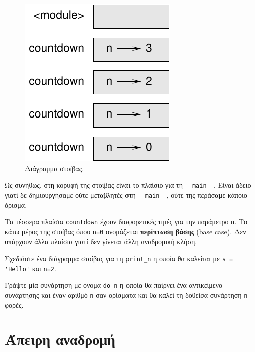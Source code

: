 \documentclass[10pt]{book}
\begin{document}
\begin{figure}
\centerline
{\includegraphics[scale=0.8]{figs/stack2.pdf}}
\caption{Διάγραμμα στοίβας.}
\label{fig.stack2}
\end{figure}


Ως συνήθως, στη κορυφή της στοίβας είναι το πλαίσιο για τη \verb"__main__". Είναι άδειο γιατί δε δημιουργήσαμε ούτε μεταβλητές στη \verb"__main__", ούτε της περάσαμε κάποιο όρισμα.

Τα τέσσερα πλαίσια {\tt countdown} έχουν διαφορετικές τιμές για την παράμετρο {\tt n}. Το κάτω μέρος της στοίβας όπου {\tt n=0} ονομάζεται {\bf περίπτωση βάσης} (base case). Δεν υπάρχουν άλλα πλαίσια γιατί δεν γίνεται άλλη αναδρομική κλήση.\\

\begin{exercise}

Σχεδιάστε ένα διάγραμμα στοίβας για τη \verb"print_n" η οποία θα καλείται με \verb"s = 'Hello'" και {\tt n=2}.\\

\end{exercise}

\begin{exercise}

Γράψτε μία συνάρτηση με όνομα \verb"do_n" η οποία θα παίρνει ένα αντικείμενο συνάρτησης και έναν αριθμό {\tt n} σαν ορίσματα και θα καλεί τη δοθείσα συνάρτηση {\tt n} φορές.

\end{exercise}


\section{Άπειρη αναδρομή}
\end{document}
